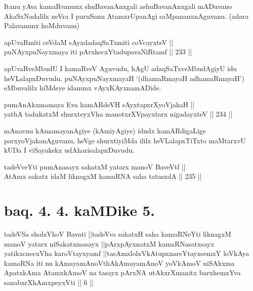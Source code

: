\begin{artha}
Itanu yAva kamaRvanunx shuBavanAnxgali ashuBavanAnxgali mADuvano
AkaSxNadalilx neVra I puruSanu AtamxrUpanAgi saMpananxnAguvanu.
(adara Palavanunx hoMduvanu) 
\end{artha}


\begin{shl}
apUvaRmiti ceVdaM sAyxdadaqSaTxmiti coVcayxteV || \\
puNAyxpuNayxmaya iti pArxkecxYtadupavaNiRtamf ||  233 ||  
\end{shl}

\begin{artha}
apUvaRveMbudU I kamaRveV Aguvudu, hAgU adaqSaTxveMbudAgiyU idu
heVLalapxDuvudu. puNAyxpuNayxmayaH `(dhamaRmayaH adhamaRmayaH')
eMbuvalilx hiMdeye idanunx vAyxKAyxnamADide.
\end{artha}


\begin{shl}
pumAnAkxmamaya Eva kamARdeVH sAyxtapxrXyoVjakaH || \\
yathA tadukatxM shurxteyxVha manotxrXV\s payxtarx nigadayxteV ||  234 ||  
\end{shl}

\begin{artha}
mAnavnu kAmamayanAgiye (kAmiyAgiye) idudx kamARdigaLige
parxyoVjakanAguvanu, heVge shurxtiyiMda ililx heVLalapxTiTxto
maMtarxvU kUDa I viSayakekx udAharisalapxDuvudu.
\end{artha}


\begin{shl}
tadeVveYti pumAnasayx sakatxM yatarx manoV BaveVtf || \\
AtAmx sakatx idaM liknagxM kamaRNA saha tatasxdA ||  235 ||  
\end{shl}

\section*{baq. 4. 4. kaMDike 5.}

\begin{shl}
tadeVSa sholxVkoV Bavati ||tadeVva sakatxH saha kamaRNeYti liknagxM manoV yatarx niSakatxmasayx ||pArxpAyxnatxM kamaRNasatxsayx yatikxcnecxVha karoVtayxyamf ||tasAmxlolxVkAtupxnareYtayxsemxY loVkAya kamaRNa iti nu kAmayamAnoV\s thAkAmayamAnoV yoV\s kAmoV niSAkxma ApatxkAma AtamxkAmoV na tasayx pArxNA utAkxrXmanitx barxhemxYva sanabxrXhAmxpeyxVti || 6 ||
\end{shl}


